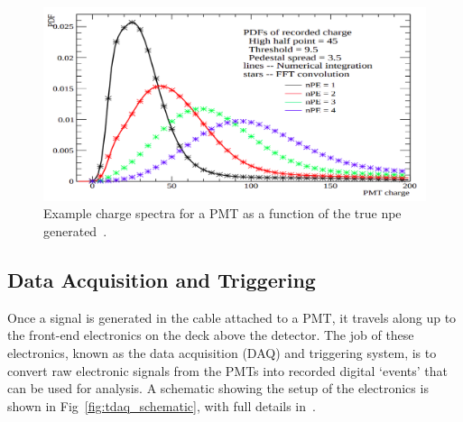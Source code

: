 \begin{figure}
    \centering
    \includegraphics[width=0.8\linewidth]{2_Detector/Figs/charge_spectra.png}
    \caption[Example charge spectra for a PMT as a function of the true npe generated]{Example charge spectra for a PMT as a function of the true npe generated~\cite{}. %
    }
    \label{fig:charge_dists_pmt}
\end{figure}


\subsection{Data Acquisition and Triggering}\label{sec:daq}
Once a signal is generated in the cable attached to a PMT, it travels along up to the front-end electronics on the deck above the detector. The job of these electronics, known as the data acquisition (DAQ) and triggering system, is to convert raw electronic signals from the PMTs into recorded digital `events' that can be used for analysis. A schematic showing the setup of the electronics is shown in Fig~\ref{fig:tdaq_schematic}, with full details in~\cite{}. %

